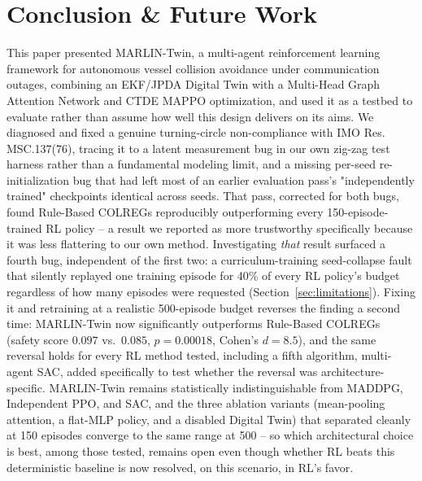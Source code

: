 \documentclass[journal,twocolumn,10pt]{IEEEtran}
\begin{document}
\begin{itemize}
\end{itemize}

\section{Conclusion \& Future Work}
This paper presented MARLIN-Twin, a multi-agent reinforcement learning framework for autonomous vessel collision avoidance under communication outages, combining an EKF/JPDA Digital Twin with a Multi-Head Graph Attention Network and CTDE MAPPO optimization, and used it as a testbed to evaluate rather than assume how well this design delivers on its aims. We diagnosed and fixed a genuine turning-circle non-compliance with IMO Res. MSC.137(76), tracing it to a latent measurement bug in our own zig-zag test harness rather than a fundamental modeling limit, and a missing per-seed re-initialization bug that had left most of an earlier evaluation pass's "independently trained" checkpoints identical across seeds. That pass, corrected for both bugs, found Rule-Based COLREGs reproducibly outperforming every 150-episode-trained RL policy -- a result we reported as more trustworthy specifically because it was less flattering to our own method. Investigating \emph{that} result surfaced a fourth bug, independent of the first two: a curriculum-training seed-collapse fault that silently replayed one training episode for 40\% of every RL policy's budget regardless of how many episodes were requested (Section~\ref{sec:limitations}). Fixing it and retraining at a realistic 500-episode budget reverses the finding a second time: MARLIN-Twin now significantly outperforms Rule-Based COLREGs (safety score $0.097$ vs.\ $0.085$, $p=0.00018$, Cohen's $d=8.5$), and the same reversal holds for every RL method tested, including a fifth algorithm, multi-agent SAC, added specifically to test whether the reversal was architecture-specific. MARLIN-Twin remains statistically indistinguishable from MADDPG, Independent PPO, and SAC, and the three ablation variants (mean-pooling attention, a flat-MLP policy, and a disabled Digital Twin) that separated cleanly at 150 episodes converge to the same range at 500 -- so which architectural choice is best, among those tested, remains open even though whether RL beats this deterministic baseline is now resolved, on this scenario, in RL's favor.
\end{document}
